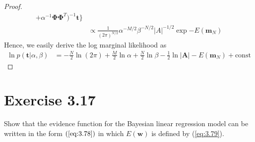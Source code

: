 \begin{proof}
\begin{align*}
                + \alpha^{-1}\mathbf{\Phi}\mathbf{\Phi}^T)^{-1}\mathbf{t}\bigg\} \\
        &\propto \frac{1}{(2\pi)^{N/2}} \alpha^{-M/2} \beta^{-N/2} |A|^{-1/2}
            \exp{-E(\mathbf{m}_N)}
    \end{align*}
    Hence, we easily derive the log marginal likelihood as
    \begin{align*}
        \ln p(\mathbf{t} | \alpha, \beta)
        &= -\frac{N}{2} \ln(2\pi) + \frac{M}{2} \ln \alpha + \frac{N}{2} \ln \beta
    - \frac{1}{2} \ln |\mathbf{A}| - E(\mathbf{m}_N) + \text{const} \tag{3.86}
    \end{align*}
\end{proof}

\section*{Exercise 3.17}
Show that the evidence function for the Bayesian linear regression
model can be written in the form $(\ref{eq:3.78})$ in which
$E(\mathbf{w})$ is defined by (\ref{eq:3.79}).

\vspace{1em}

